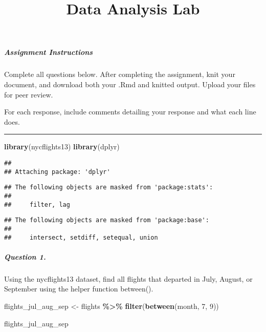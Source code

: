 \documentclass[
]{article}
\title{Data Analysis Lab}
\author{}
\date{\vspace{-2.5em}}
\newenvironment{Shaded}{\begin{snugshade}}{\end{snugshade}}
\newcommand{\DecValTok}[1]{\textcolor[rgb]{0.00,0.00,0.81}{#1}}
\newcommand{\FunctionTok}[1]{\textcolor[rgb]{0.13,0.29,0.53}{\textbf{#1}}}
\newcommand{\NormalTok}[1]{#1}
\newcommand{\OtherTok}[1]{\textcolor[rgb]{0.56,0.35,0.01}{#1}}
\newcommand{\SpecialCharTok}[1]{\textcolor[rgb]{0.81,0.36,0.00}{\textbf{#1}}}
\begin{document}
\maketitle

\hypertarget{assignment-instructions}{%
\subparagraph{Assignment Instructions}\label{assignment-instructions}}

Complete all questions below. After completing the assignment, knit your
document, and download both your .Rmd and knitted output. Upload your
files for peer review.

For each response, include comments detailing your response and what
each line does.

\begin{center}\rule{0.5\linewidth}{0.5pt}\end{center}

\begin{Shaded}
\begin{Highlighting}[]
\FunctionTok{library}\NormalTok{(nycflights13)}
\FunctionTok{library}\NormalTok{(dplyr)}
\end{Highlighting}
\end{Shaded}

\begin{verbatim}
## 
## Attaching package: 'dplyr'
\end{verbatim}

\begin{verbatim}
## The following objects are masked from 'package:stats':
## 
##     filter, lag
\end{verbatim}

\begin{verbatim}
## The following objects are masked from 'package:base':
## 
##     intersect, setdiff, setequal, union
\end{verbatim}

\hypertarget{question-1.}{%
\subparagraph{Question 1.}\label{question-1.}}

Using the nycflights13 dataset, find all flights that departed in July,
August, or September using the helper function between().

\begin{Shaded}
\begin{Highlighting}[]
\NormalTok{flights\_jul\_aug\_sep }\OtherTok{\textless{}{-}}\NormalTok{ flights }\SpecialCharTok{\%\textgreater{}\%}
  \FunctionTok{filter}\NormalTok{(}\FunctionTok{between}\NormalTok{(month, }\DecValTok{7}\NormalTok{, }\DecValTok{9}\NormalTok{))}

\NormalTok{flights\_jul\_aug\_sep}
\end{Highlighting}
\end{Shaded}
\end{document}
